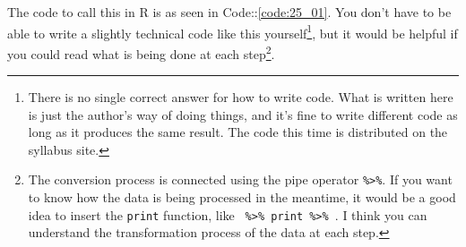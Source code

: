 \documentclass{ltjsbook}
\begin{document}
The code to call this in R is as seen in Code::\ref{code:25_01}. You don't have to be able to write a slightly technical code like this yourself\footnote{There is no single correct answer for how to write code. What is written here is just the author's way of doing things, and it's fine to write different code as long as it produces the same result. The code this time is distributed on the syllabus site.}, but it would be helpful if you could read what is being done at each step\footnote{The conversion process is connected using the pipe operator \verb|%>%|. If you want to know how the data is being processed in the meantime, it would be a good idea to insert the \verb|print| function, like \verb| %>% print %>% |. I think you can understand the transformation process of the data at each step.}.



\end{document}
